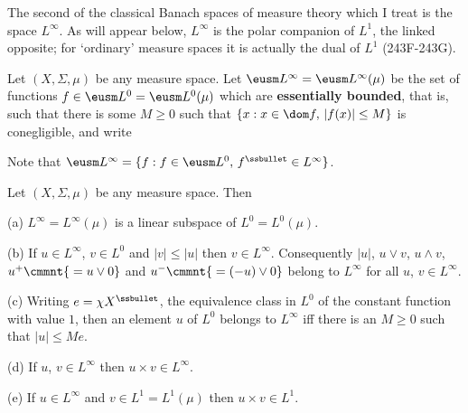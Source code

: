      
\def\chaptername{Function spaces}
\def\sectionname{$L^{\infty}$}
     
     
The second of the classical Banach spaces of measure theory which I treat is the space
$L^{\infty}$.   As will appear below, $L^{\infty}$ is the polar
companion of $L^1$, the linked opposite;   for `ordinary' measure
spaces it is actually the dual of $L^1$ (243F-243G).
     
  Let $(X,\Sigma,\mu)$ be any measure
space.    Let $\eusm L^{\infty}=\eusm L^{\infty}(\mu)$ be the set of
functions $f\in\eusm L^0=\eusm L^0(\mu)$ which are {\bf essentially bounded}, that is, such
that there is some $M\ge 0$ such that $\{x:x\in\dom f,\,|f(x)|\le M\}$ is conegligible, and write
     
     
Note that 
$\eusm L^{\infty}=\{f:f\in\eusm L^0,\,f^{\ssbullet}\in L^{\infty}\}$.
     
  Let $(X,\Sigma,\mu)$ be any measure space.   Then
     
(a) $L^{\infty}=L^{\infty}(\mu)$ is a linear subspace of $L^0=L^0(\mu)$.
     
(b) If $u\in L^{\infty}$, $v\in L^0$ and
$|v|\le|u|$ then $v\in L^{\infty}$.   Consequently $|u|$, $u\vee v$,
$u\wedge v$, $u^+\cmmnt{\mskip5mu =u\vee 0}$ and 
$u^-\cmmnt{\mskip5mu =(-u)\vee 0}$
belong to $L^{\infty}$ for all $u$, $v\in L^{\infty}$.
     
(c) Writing $e=\chi X^{\ssbullet}$, the equivalence class in $L^0$ of
the constant function with value $1$, then an element $u$ of $L^0$
belongs to $L^{\infty}$ iff there is an $M\ge 0$ such that $|u|\le Me$.
     
(d) If $u$, $v\in L^{\infty}$ then $u\times v\in L^{\infty}$.
     
(e) If $u\in L^{\infty}$ and $v\in L^1=L^1(\mu)$ then 
$u\times v\in L^1$.
     

